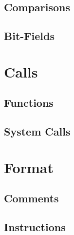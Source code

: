 \documentclass{scrartcl}
\begin{document}
        \subsection{Comparisons}
        \subsection{Bit-Fields}
    \section{Calls}
        \subsection{Functions}
        \subsection{System Calls}
    \section{Format}
        \subsection{Comments}
        \subsection{Instructions}
\end{document}
